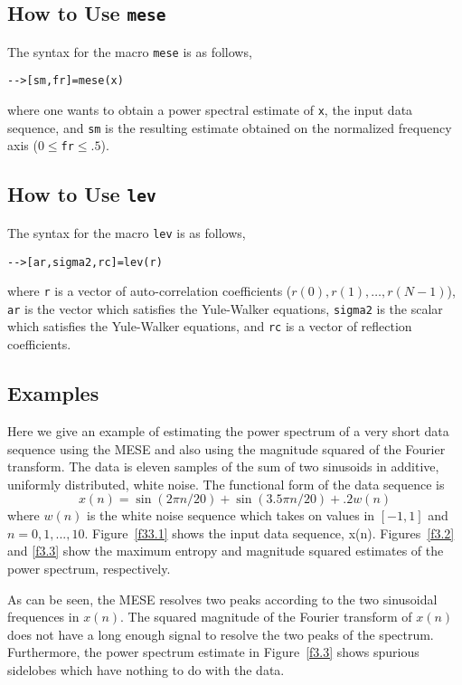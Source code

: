 \subsection{How to Use {\tt mese}}

	The syntax for the macro {\tt mese} is as follows,
\begin{verbatim}
-->[sm,fr]=mese(x)
\end{verbatim}
where one wants to obtain a power spectral estimate of
{\tt x}, the input data sequence, and {\tt sm} is the resulting
estimate obtained on the normalized frequency axis ($0\le${\tt fr}$\le .5$).

\subsection{How to Use {\tt lev}}

	The syntax for the macro {\tt lev} is as follows,
\begin{verbatim}
-->[ar,sigma2,rc]=lev(r)
\end{verbatim}
where {\tt r} is a vector of auto-correlation coefficients ($r(0),r(1),
\ldots,r(N-1)$), {\tt ar} is the vector which satisfies the Yule-Walker
equations, {\tt sigma2} is the scalar which satisfies the Yule-Walker
equations, and {\tt rc} is a vector of reflection coefficients.

\subsection{Examples}

	Here we give an example of estimating the power spectrum of 
a very short data sequence using the MESE and also using the magnitude
squared of the Fourier transform.  The data is eleven
samples of the sum of two 
sinusoids in additive, uniformly distributed, white noise.  The functional
form of the data sequence is
%
\begin{equation}
x(n)=\sin(2\pi n/20)+\sin(3.5\pi n/20)+.2w(n)
\end{equation}
%
where $w(n)$ is the white noise sequence which takes on values in $[-1,1]$
and $n=0,1,...,10$.  Figure~\ref{f33.1} shows the input data sequence, x(n).
Figures~\ref{f3.2} and \ref{f3.3} show the maximum entropy and magnitude
squared estimates of the power spectrum, respectively.
%

%
%

%

%
As can be seen, the MESE resolves two peaks according to the 
two sinusoidal frequences in $x(n)$.  The squared magnitude of
the Fourier transform of $x(n)$ does not have a long enough signal
to resolve the two peaks of the spectrum.  Furthermore, the
power spectrum estimate in Figure~\ref{f3.3} shows spurious sidelobes
which have nothing to do with the data.



%
